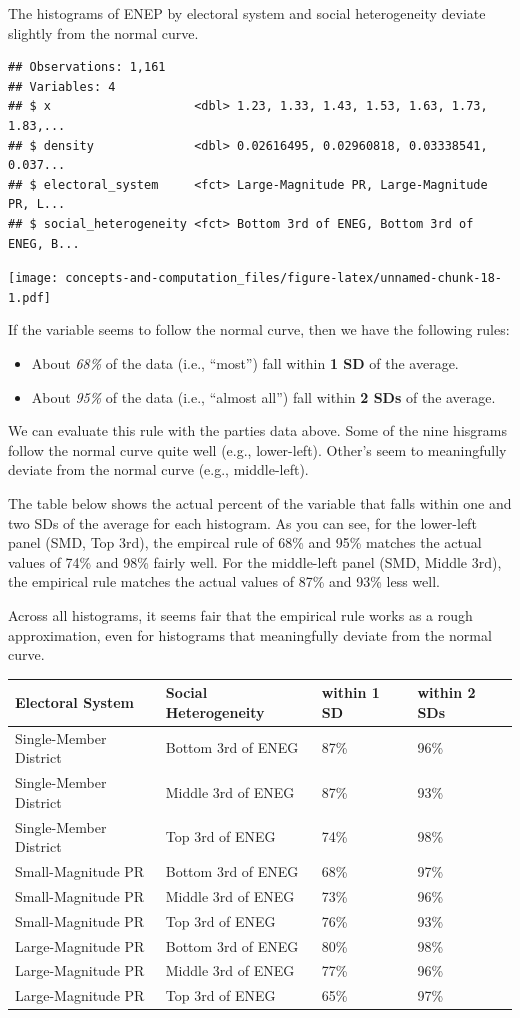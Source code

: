 \documentclass[]{book}
\providecommand{\tightlist}{%
  \setlength{\itemsep}{0pt}\setlength{\parskip}{0pt}}
\begin{document}
The histograms of ENEP by electoral system and social heterogeneity deviate slightly from the normal curve.

\begin{verbatim}
## Observations: 1,161
## Variables: 4
## $ x                    <dbl> 1.23, 1.33, 1.43, 1.53, 1.63, 1.73, 1.83,...
## $ density              <dbl> 0.02616495, 0.02960818, 0.03338541, 0.037...
## $ electoral_system     <fct> Large-Magnitude PR, Large-Magnitude PR, L...
## $ social_heterogeneity <fct> Bottom 3rd of ENEG, Bottom 3rd of ENEG, B...
\end{verbatim}

\texttt{[image: concepts-and-computation\_files/figure-latex/unnamed-chunk-18-1.pdf]}

If the variable seems to follow the normal curve, then we have the following rules:

\begin{itemize}
\tightlist
\item
  About \emph{68\%} of the data (i.e., ``most'') fall within \textbf{1 SD} of the average.
\item
  About \emph{95\%} of the data (i.e., ``almost all'') fall within \textbf{2 SDs} of the average.
\end{itemize}

We can evaluate this rule with the parties data above. Some of the nine hisgrams follow the normal curve quite well (e.g., lower-left). Other's seem to meaningfully deviate from the normal curve (e.g., middle-left).

The table below shows the actual percent of the variable that falls within one and two SDs of the average for each histogram. As you can see, for the lower-left panel (SMD, Top 3rd), the empircal rule of 68\% and 95\% matches the actual values of 74\% and 98\% fairly well. For the middle-left panel (SMD, Middle 3rd), the empirical rule matches the actual values of 87\% and 93\% less well.

Across all histograms, it seems fair that the empirical rule works as a rough approximation, even for histograms that meaningfully deviate from the normal curve.

\begin{longtable}[]{@{}llll@{}}
\toprule
Electoral System & Social Heterogeneity & within 1 SD & within 2 SDs\tabularnewline
\midrule
\endhead
Single-Member District & Bottom 3rd of ENEG & 87\% & 96\%\tabularnewline
Single-Member District & Middle 3rd of ENEG & 87\% & 93\%\tabularnewline
Single-Member District & Top 3rd of ENEG & 74\% & 98\%\tabularnewline
Small-Magnitude PR & Bottom 3rd of ENEG & 68\% & 97\%\tabularnewline
Small-Magnitude PR & Middle 3rd of ENEG & 73\% & 96\%\tabularnewline
Small-Magnitude PR & Top 3rd of ENEG & 76\% & 93\%\tabularnewline
Large-Magnitude PR & Bottom 3rd of ENEG & 80\% & 98\%\tabularnewline
Large-Magnitude PR & Middle 3rd of ENEG & 77\% & 96\%\tabularnewline
Large-Magnitude PR & Top 3rd of ENEG & 65\% & 97\%\tabularnewline
\bottomrule
\end{longtable}
\end{document}
